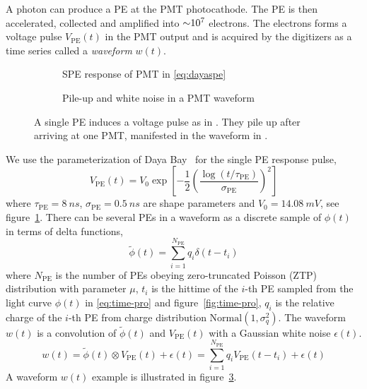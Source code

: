 A photon can produce a PE at the PMT photocathode.  The PE is then accelerated, collected and amplified into $\num[retain-unity-mantissa=false]{\sim 1e7}$ electrons.  The electrons forms a voltage pulse $V_\mathrm{PE}(t)$ in the PMT output and is acquired by the digitizers as a time series called a \textit{waveform} $w(t)$.

\begin{figure}[H]
  \begin{subfigure}{.49\textwidth}
    \centering
    \resizebox{\textwidth}{!}{}
    \caption{\label{fig:spe} SPE response of PMT in \eqref{eq:dayaspe}}
  \end{subfigure}
  \begin{subfigure}{.49\textwidth}
    \centering
    \resizebox{\textwidth}{!}{}
    \caption{\label{fig:pile} Pile-up and white noise in a PMT waveform}
  \end{subfigure}
  \caption{A single PE induces a voltage pulse as in .  They pile up after arriving at one PMT, manifested in the waveform in .}
\end{figure}

We use the parameterization of Daya Bay~\cite{jetter_pmt_2012} for the single PE response pulse,
\begin{equation}
  V_\mathrm{PE}(t) = V_{0}\exp\left[-\frac{1}{2}\left(\frac{\log(t/\tau_\mathrm{PE})}{\sigma_\mathrm{PE}}\right)^{2}\right]
  \label{eq:dayaspe}
\end{equation}
where $\tau_\mathrm{PE}=\SI{8}{ns}$, $\sigma_\mathrm{PE}=\SI{0.5}{ns}$ are shape parameters and $V_{0}=\SI{14.08}{mV}$, see figure~\ref{fig:spe}.  There can be several PEs in a waveform as a discrete sample of $\phi(t)$ in terms of delta functions,
\begin{equation}
  \label{eq:lc-sample}
  \tilde{\phi}(t) = \sum_{i=1}^{N_{\mathrm{PE}}} q_i \delta(t-t_i)
\end{equation}
where $N_\mathrm{PE}$ is the number of PEs obeying zero-truncated Poisson (ZTP) distribution with parameter $\mu$, $t_i$ is the hittime of the $i$-th PE sampled from the light curve $\phi(t)$ in \eqref{eq:time-pro} and figure~\ref{fig:time-pro}, $q_i$ is the relative charge of the $i$-th PE from charge distribution $\mathrm{Normal}(1,\sigma_{q}^2)$.  The waveform $w(t)$ is a convolution of $\tilde{\phi}(t)$ and $V_\mathrm{PE}(t)$ with a Gaussian white noise $\epsilon(t)$.
\begin{equation}
  \label{eq:1}
  w(t) = \tilde{\phi}(t) \otimes V_\mathrm{PE}(t) + \epsilon(t) =  \sum_{i=1}^{N_\mathrm{PE}} q_i V_\mathrm{PE}(t-t_i) + \epsilon(t)
\end{equation}
A waveform $w(t)$ example is illustrated in figure~\ref{fig:pile}.

